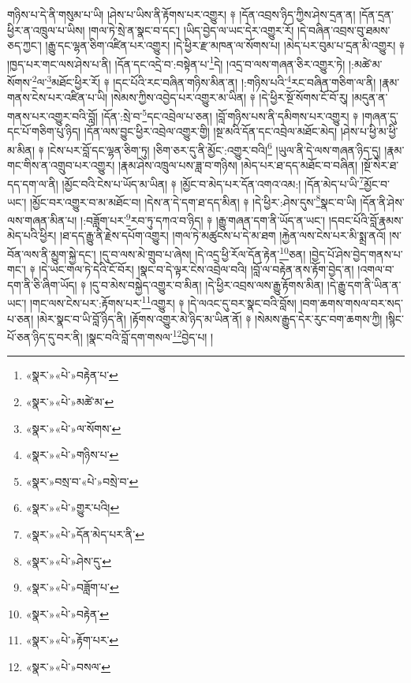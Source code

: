 གཉིས་པ་དེ་ནི་གསུམ་པ་ཡི། །ཤེས་པ་ཡིས་ནི་རྟོགས་པར་འགྱུར། ༈ །དོན་འབྲས་ཉིད་ཀྱིས་ཤེས་དྲན་ན། །དོན་དྲན་ཕྱིར་ན་འཁྲུལ་པ་ཡིས། །གལ་ཏེ་སྲེ་ན་སྣང་བ་དང་། །ཡིད་བྱེད་ལ་ཡང་དེར་འགྱུར་རོ། །དེ་བཞིན་འབྲས་བུ་ཐམས་ཅད་ཀྱང་། །རྒྱུ་དང་ལྷན་ཅིག་འཛིན་པར་འགྱུར། །དེ་ཕྱིར་རྫ་མཁན་ལ་སོགས་པ། །མེད་པར་བུམ་པ་དྲན་མི་འགྱུར། ༈ །ཁྱད་པར་གང་ལས་ཤེས་པ་ནི། །དོན་དང་འདྲེ་བ་:བསྟེན་པ་\footnote{«སྣར་»«པེ་»བརྟེན་པ་}དེ། །འདྲ་བ་ལས་གཞན་ཅིར་འགྱུར་ཏེ། །:མཚེ་མ་སོགས་\footnote{«སྣར་»«པེ་»མཚེ་མ་}ལ་\footnote{«སྣར་»«པེ་»ལ་སོགས་}མཐོང་ཕྱིར་རོ། ༈ །དང་པོའི་རང་བཞིན་གཉིས་མིན་ན། །:གཉིས་པའི་\footnote{«སྣར་»«པེ་»གཉིས་པ་}རང་བཞིན་གཅིག་ལ་ནི། །རྣམ་གནས་ངེས་པར་འཛིན་པ་ཡི། །སེམས་ཀྱིས་འབྱེད་པར་འགྱུར་མ་ཡིན། ༈ །དེ་ཕྱིར་སྔོ་སོགས་ངོ་བོ་རུ། །མདུན་ན་གནས་པར་འགྱུར་བའི་བློ། །དོན་:སྲེ་བ་\footnote{«སྣར་»བསྲ་བ་«པེ་»བསྲེ་བ་}དང་འབྲེལ་པ་ཅན། །བློ་གཉིས་པས་ནི་དམིགས་པར་འགྱུར། ༈ །གཞན་དུ་དང་པོ་གཅིག་པུ་ཉིད། །དོན་ལས་བྱུང་ཕྱིར་འབྲེལ་འགྱུར་གྱི། །སྔ་མའི་དོན་དང་འབྲེལ་མཐོང་མེད། །ཤེས་པ་ཕྱི་མ་ཕྱི་མ་མིན། ༈ །ངེས་པར་བློ་དང་ལྷན་ཅིག་ཏུ། །ཅིག་ཅར་དུ་ནི་མྱོང་:འགྱུར་བའི།\footnote{«སྣར་»«པེ་»གྱུར་པའི།} །ཡུལ་ནི་དེ་ལས་གཞན་ཉིད་དུ། །རྣམ་གང་གིས་ན་འགྲུབ་པར་འགྱུར། །རྣམ་ཤེས་འཁྲུལ་པས་ཟླ་བ་གཉིས། །མེད་པར་ཐ་དད་མཐོང་བ་བཞིན། །སྔོ་སེར་ཐ་དད་དག་ལ་ནི། །མྱོང་བའི་ངེས་པ་ཡོད་མ་ཡིན། ༈ །མྱོང་བ་མེད་པར་དོན་འགའ་འམ:། །དོན་མེད་པ་ཡི་\footnote{«སྣར་»«པེ་»དོན་མེད་པར་ནི་}མྱོང་བ་ཡང་། །མྱོང་བར་འགྱུར་བ་མ་མཐོང་བ། །དེས་ན་དེ་དག་ཐ་དད་མིན། ༈ །དེ་ཕྱིར་:ཤེས་དུས་\footnote{«སྣར་»«པེ་»ཤེས་དུ་}སྣང་བ་ཡི། །དོན་ནི་ཤེས་ལས་གཞན་མིན་པ། །:བཟློག་པར་\footnote{«སྣར་»«པེ་»བཟློག་པ་}རབ་ཏུ་དཀའ་བ་ཉིད། ༈ །རྒྱུ་གཞན་དག་ནི་ཡོད་ན་ཡང་། །དབང་པོའི་བློ་རྣམས་མེད་པའི་ཕྱིར། །ཐ་དད་རྒྱུ་ནི་རྗེས་དཔོག་འགྱུར། །གལ་ཏེ་མཚུངས་པ་དེ་མ་ཐག །རྐྱེན་ལས་ངེས་པར་མི་སྨྲ་ནའོ། །ས་བོན་ལས་ནི་མྱུག་སྐྱེ་དང་། །དུ་བ་ལས་མེ་གྲུབ་པ་ཞེས། །དེ་འདྲ་ཕྱི་རོལ་དོན་རྟེན་\footnote{«སྣར་»«པེ་»བརྟེན་}ཅན། །བྱེད་པོ་ཤེས་བྱེད་གནས་པ་གང་། ༈ །དེ་ཡང་གལ་ཏེ་དེའི་ངོ་བོར། །སྣང་བ་དེ་ལྟར་ངེས་འབྲེལ་བའི། །བློ་ལ་བརྟེན་ནས་རྟོག་བྱེད་ན། །འགལ་བ་དག་ནི་ཅི་ཞིག་ཡོད། ༈ །དུ་བ་མེས་བསྐྱེད་འགྱུར་བ་མིན། །དེ་ཕྱིར་འབྲས་ལས་རྒྱུ་རྟོགས་མིན། །དེ་རྒྱུ་དག་ནི་ཡིན་ན་ཡང་། །གང་ལས་ངེས་པར་:རྟོགས་པར་\footnote{«སྣར་»«པེ་»རྟོག་པར་}འགྱུར། ༈ །དེ་ལའང་དུ་བར་སྣང་བའི་བློས། །བག་ཆགས་གསལ་བར་སད་པ་ཅན། །མེར་སྣང་བ་ཡི་བློ་ཉིད་ནི། །རྟོགས་འགྱུར་མེ་ཉིད་མ་ཡིན་ནོ། ༈ །སེམས་རྒྱུད་དེར་རུང་བག་ཆགས་ཀྱི། །སྙིང་པོ་ཅན་ཉིད་དུ་བར་ནི། །སྣང་བའི་བློ་དག་གསལ་\footnote{«སྣར་»«པེ་»བསལ་}བྱེད་པ། །

